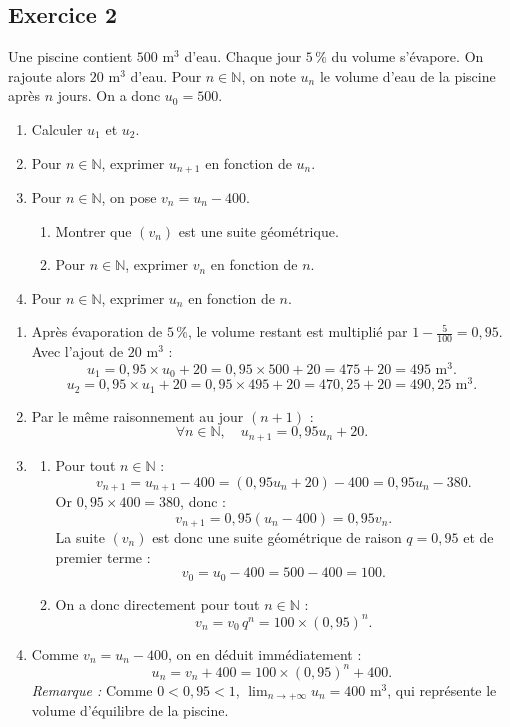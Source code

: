 \documentclass[11pt,a4paper]{article}
\newcommand{\N}{\mathbb{N}}
\begin{document}
\subsection*{Exercice 2}
Une piscine contient $500\text{~m}^3$ d'eau. Chaque jour $5\,\%$ du volume s'évapore. On rajoute alors $20\text{~m}^3$ d'eau.
Pour $n \in \N$, on note $u_n$ le volume d'eau de la piscine après $n$ jours. On a donc $u_0 = 500$.
\begin{enumerate}
    \item Calculer $u_1$ et $u_2$.
    \item Pour $n \in \N$, exprimer $u_{n+1}$ en fonction de $u_n$.
    \item Pour $n \in \N$, on pose $v_n = u_n - 400$.
    \begin{enumerate}
        \item Montrer que $(v_n)$ est une suite géométrique.
        \item Pour $n \in \N$, exprimer $v_n$ en fonction de $n$.
    \end{enumerate}
    \item Pour $n \in \N$, exprimer $u_n$ en fonction de $n$.
\end{enumerate}

\begin{correctionbox}
\begin{enumerate}
    \item Après évaporation de $5\,\%$, le volume restant est multiplié par $1 - \frac{5}{100} = 0{,}95$. Avec l'ajout de $20\text{~m}^3$ :
    \[
    u_1 = 0{,}95 \times u_0 + 20 = 0{,}95 \times 500 + 20 = 475 + 20 = 495\text{~m}^3.
    \]
    \[
    u_2 = 0{,}95 \times u_1 + 20 = 0{,}95 \times 495 + 20 = 470{,}25 + 20 = 490{,}25\text{~m}^3.
    \]
    \item Par le même raisonnement au jour $(n+1)$ :
    \[
    \forall n \in \N, \quad u_{n+1} = 0{,}95 u_n + 20.
    \]
    \item
    \begin{enumerate}
        \item Pour tout $n \in \N$ :
        \[
        v_{n+1} = u_{n+1} - 400 = (0{,}95 u_n + 20) - 400 = 0{,}95 u_n - 380.
        \]
        Or $0{,}95 \times 400 = 380$, donc :
        \[
        v_{n+1} = 0{,}95(u_n - 400) = 0{,}95 v_n.
        \]
        La suite $(v_n)$ est donc une suite géométrique de raison $q = 0{,}95$ et de premier terme :
        \[
        v_0 = u_0 - 400 = 500 - 400 = 100.
        \]
        \item On a donc directement pour tout $n \in \N$ :
        \[
        v_n = v_0 \, q^n = 100 \times (0{,}95)^n.
        \]
    \end{enumerate}
    \item Comme $v_n = u_n - 400$, on en déduit immédiatement :
    \[
    u_n = v_n + 400 = 100 \times (0{,}95)^n + 400.
    \]
    \textit{Remarque :} Comme $0 < 0{,}95 < 1$, $\lim_{n \to +\infty} u_n = 400\text{~m}^3$, qui représente le volume d'équilibre de la piscine.
\end{enumerate}
\end{correctionbox}
\end{document}
